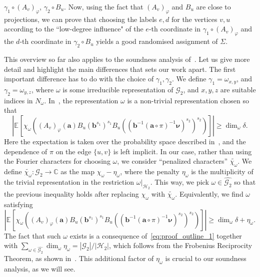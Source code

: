 \documentclass[a4paper,11pt]{article}
\theoremstyle{definition}
\newcommand{\tuple}[1]{{\mathbf{#1}}}
\newcommand{\cc}{\mathbb{C}}
\newcommand{\ex}[1]{\mathbb{E}_{#1}}
\newcommand{\gr}{\mathscr{G}}
\newcommand{\sgr}{\mathscr{H}}
\begin{document}
$\gamma_1 \circ (A_v)_\varphi$, $\gamma_2 \circ B_u$. Now, using the fact that $(A_v)_\varphi$
and $B_u$ are close to projections, we can prove that choosing the labels $e, d$ for the vertices $v,u$ according to the ``low-degree influence" of the $e$-th coordinate in $\gamma_1 \circ (A_v)_\varphi$ and the $d$-th coordinate in $\gamma_2 \circ B_u$ yields a good randomised assignment of $\Sigma$. \par
This overview so far also applies to the soundness analysis of~\cite{EHR04:tcs}. Let us give more detail and highlight the main differences that sets our work apart. The first important difference has to do with the choice of $\gamma_1, \gamma_2$. We define
$\gamma_1= \omega_{x,y}$, and $\gamma_2= \omega_{y,z}$, 
where $\omega$ is some irreducible representation of $\gr_2$, and $x,y,z$ are suitable indices in $N_\omega$. In~\cite{EHR04:tcs}, the representation $\omega$ is a non-trivial representation chosen so that
\begin{equation*}
\left|
\ex{}\left[
\chi_\omega\left( (A_v)_{\varphi}(\tuple{a}) B_u(\tuple{b}^{s_1})^{s_1} B_u((\tuple{b}^{-1} (\tuple{a} \circ \pi)^{-1}\bm{\nu})^{s_2})^{s_2} \right)
\right] \right| \geq \dim_\omega \delta.
\end{equation*}
Here the expectation is taken over the probability space described in~, and the dependence of $\pi$ on the edge $\{u,v\}$ is left implicit.
In our case, rather than using the Fourier characters for choosing $\omega$, we consider ``penalized characters'' $\widetilde{\chi_\omega}$. We define $\widetilde{\chi_\omega}: \gr_2 \rightarrow \cc$ as the map 
$\chi_\omega - \eta_\omega$, where
the penalty $\eta_\omega$ is the multiplicity of the trivial representation in the restriction $\omega\vert_{\sgr_2}$. This way, we pick $\omega\in\widehat{\gr_2}$ so that the previous inequality holds after replacing $\chi_\omega$ with $\widetilde{\chi_\omega}$. Equivalently, we find $\omega$ satisfying
\begin{equation}
\label{eq:choice_of_representation3}
\left|
\ex{}\left[
\chi_\omega\left( (A_v)_{\varphi}(\tuple{a}) B_u(\tuple{b}^{s_1})^{s_1} B_u((\tuple{b}^{-1} (\tuple{a} \circ \pi)^{-1}\bm{\nu})^{s_2})^{s_2} \right)
\right] \right| \geq  \dim_\omega \delta+ \eta_\omega .
\end{equation}
The fact that such $\omega$ exists is a consequence of~\eqref{eq:proof_outline_1} together with $\sum_{\omega\in \widehat{\gr_2}} \dim_\omega \eta_\omega = |\gr_2|/|\sgr_2|$, which follows from the Frobenius Reciprocity Theorem, as shown in~. This additional factor of $\eta_\omega$ is crucial to our soundness analysis, as we will see. \par
\end{document}

